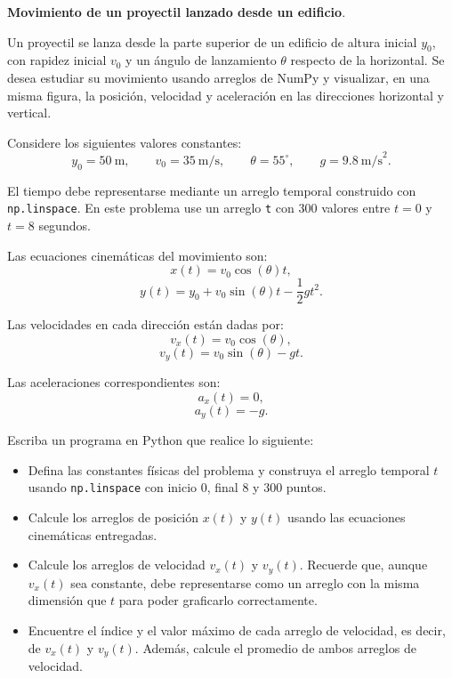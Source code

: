 \providecommand{\Needspace}[1]{}
\Needspace{8\baselineskip}
\item \textbf{Movimiento de un proyectil lanzado desde un edificio}.
\nopagebreak[4]

\begin{tcolorbox}[colback=blue!2!white,colframe=blue!55!black,title={Enunciado},breakable]
Un proyectil se lanza desde la parte superior de un edificio de altura inicial $y_0$, con rapidez inicial $v_0$ y un ángulo de lanzamiento $\theta$ respecto de la horizontal. Se desea estudiar su movimiento usando arreglos de NumPy y visualizar, en una misma figura, la posición, velocidad y aceleración en las direcciones horizontal y vertical.

Considere los siguientes valores constantes:
\[
y_0 = 50 \ \text{m}, 
\qquad 
v_0 = 35 \ \text{m/s},
\qquad 
\theta = 55^\circ,
\qquad 
g = 9.8 \ \text{m/s}^2.
\]

El tiempo debe representarse mediante un arreglo temporal construido con \texttt{np.linspace}. En este problema use un arreglo \texttt{t} con $300$ valores entre $t=0$ y $t=8$ segundos.

Las ecuaciones cinemáticas del movimiento son:
\[
x(t) = v_0 \cos(\theta)t,
\]
\[
y(t) = y_0 + v_0 \sin(\theta)t - \frac{1}{2}gt^2.
\]

Las velocidades en cada dirección están dadas por:
\[
v_x(t) = v_0 \cos(\theta),
\]
\[
v_y(t) = v_0 \sin(\theta) - gt.
\]

Las aceleraciones correspondientes son:
\[
a_x(t) = 0,
\]
\[
a_y(t) = -g.
\]

Escriba un programa en Python que realice lo siguiente:

\begin{itemize}
    \item[(a)] Defina las constantes físicas del problema y construya el arreglo temporal $t$ usando \texttt{np.linspace} con inicio $0$, final $8$ y $300$ puntos.

    \item[(b)] Calcule los arreglos de posición $x(t)$ y $y(t)$ usando las ecuaciones cinemáticas entregadas.

    \item[(c)] Calcule los arreglos de velocidad $v_x(t)$ y $v_y(t)$. Recuerde que, aunque $v_x(t)$ sea constante, debe representarse como un arreglo con la misma dimensión que $t$ para poder graficarlo correctamente.

    \item[(d)] Encuentre el índice y el valor máximo de cada arreglo de velocidad, es decir, de $v_x(t)$ y $v_y(t)$. Además, calcule el promedio de ambos arreglos de velocidad.


\end{itemize}
\end{tcolorbox}
